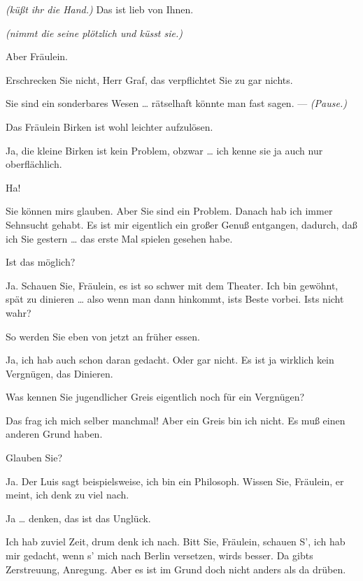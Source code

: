 \documentclass[
	final,
	a4paper,
	ngerman,
	mpinclude = true, %
	twoside = true,
	open = right,
	cleardoublepage = plain,
	DIV = 13,
	BCOR = 1cm,
	titlepage = firstiscover,
	]{scrbook}
\newcommand{\direction}[1]{\textit{(#1)}}
\newcommand{\thecharacter}[1]{\textup{\textsc{#1}}\xspace}
\newcommand{\theschauspielerin}{\thecharacter{Schauspielerin}}
\newcommand{\thegraf}{\thecharacter{Entrepeneurin}}
\newcommand{\character}[1]{\item[#1:]}
\newcommand{\schauspielerin}{\character{\theschauspielerin}}
\newcommand{\entrepeneurin}{\character{\thegraf}}
\begin{document}
\begin{play}
	\entrepeneurin
	\direction{küßt ihr die Hand.} Das ist lieb von Ihnen.

	\schauspielerin
	\direction{nimmt die seine plötzlich und küsst sie.}

	\entrepeneurin
	Aber Fräulein.

	\schauspielerin
	Erschrecken Sie nicht, Herr Graf, das verpflichtet Sie zu gar nichts.

	\entrepeneurin
	Sie sind ein sonderbares Wesen \ldots{} rätselhaft könnte man fast sagen. --- \direction{Pause.}

	\schauspielerin
	Das Fräulein Birken ist wohl leichter aufzulösen.

	\entrepeneurin
	Ja, die kleine Birken ist kein Problem, obzwar \ldots{} ich kenne sie ja auch nur oberflächlich.

	\schauspielerin
	Ha!

	\entrepeneurin
	Sie können mirs glauben. Aber Sie sind ein Problem. Danach hab ich immer Sehnsucht gehabt. Es ist mir eigentlich ein großer Genuß entgangen, dadurch, daß ich Sie gestern \ldots{} das erste Mal spielen gesehen habe.

	\schauspielerin
	Ist das möglich?

	\entrepeneurin
	Ja. Schauen Sie, Fräulein, es ist so schwer mit dem Theater. Ich bin gewöhnt, spät zu dinieren \ldots{} also wenn man dann hinkommt, ists Beste vorbei. Ists nicht wahr?

	\schauspielerin
	So werden Sie eben von jetzt an früher essen.

	\entrepeneurin
	Ja, ich hab auch schon daran gedacht. Oder gar nicht. Es ist ja wirklich kein Vergnügen, das Dinieren.

	\schauspielerin
	Was kennen Sie jugendlicher Greis eigentlich noch für ein Vergnügen?

	\entrepeneurin
	Das frag ich mich selber manchmal! Aber ein Greis bin ich nicht. Es muß einen anderen Grund haben.

	\schauspielerin
	Glauben Sie?

	\entrepeneurin
	Ja. Der Luis sagt beispielsweise, ich bin ein Philosoph. Wissen Sie, Fräulein, er meint, ich denk zu viel nach.

	\schauspielerin
	Ja \ldots{} denken, das ist das Unglück.

	\entrepeneurin
	Ich hab zuviel Zeit, drum denk ich nach. Bitt Sie, Fräulein, schauen S', ich hab mir gedacht, wenn s' mich nach Berlin versetzen, wirds besser. Da gibts Zerstreuung, Anregung. Aber es ist im Grund doch nicht anders als da drüben.


\end{play}
\end{document}
